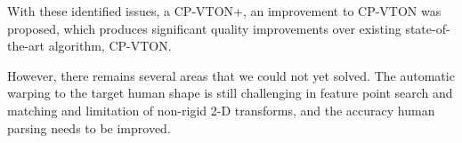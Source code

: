 \documentclass[runningheads]{llncs}
\begin{document}
With these identified issues, a CP-VTON+, an improvement to CP-VTON was proposed, which produces significant quality improvements over existing state-of-the-art algorithm, CP-VTON. 

However, there remains several areas that we could not yet solved. The automatic warping to the target human shape is still challenging in feature point search and matching and limitation of non-rigid 2-D transforms, and the accuracy human parsing  needs to be improved.
  
     
\clearpage
%
%


\end{document}
